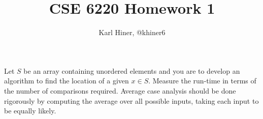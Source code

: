 \documentclass[twoside,10pt]{article}
\begin{document}
\title{CSE 6220 Homework 1}
\author{Karl Hiner, @khiner6}
\date{}
\maketitle

\section{}

Let $S$ be an array containing unordered elements and you are to develop an algorithm to find the location of a given $x \in S$.
Measure the run-time in terms of the number of comparisons required.
Average case analysis should be done rigorously by computing the average over all possible inputs, taking each input to be equally likely.
\end{document}
